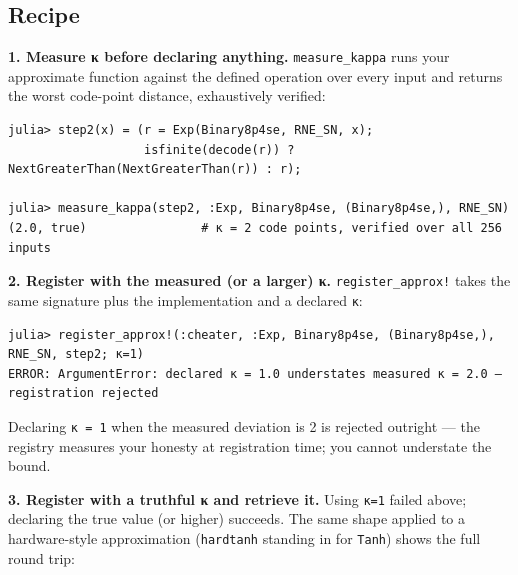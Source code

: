 \subsection{Recipe}



\label{111379208343275940-dup5}{}


\textbf{1. Measure κ before declaring anything.} \texttt{measure\_\allowbreak{}kappa} runs your approximate function against the defined operation over every input and returns the worst code-point distance, exhaustively verified:




\nopagebreak[4]
\begin{verbatim}
julia> step2(x) = (r = Exp(Binary8p4se, RNE_SN, x);
                   isfinite(decode(r)) ? NextGreaterThan(NextGreaterThan(r)) : r);

julia> measure_kappa(step2, :Exp, Binary8p4se, (Binary8p4se,), RNE_SN)
(2.0, true)                # κ = 2 code points, verified over all 256 inputs
\end{verbatim}



\textbf{2. Register with the measured (or a larger) κ.} \texttt{register\_\allowbreak{}approx!} takes the same signature plus the implementation and a declared \texttt{κ}:




\nopagebreak[4]
\begin{verbatim}
julia> register_approx!(:cheater, :Exp, Binary8p4se, (Binary8p4se,), RNE_SN, step2; κ=1)
ERROR: ArgumentError: declared κ = 1.0 understates measured κ = 2.0 — registration rejected
\end{verbatim}



Declaring \texttt{κ = 1} when the measured deviation is 2 is rejected outright — the registry measures your honesty at registration time; you cannot understate the bound.



\textbf{3. Register with a truthful κ and retrieve it.} Using \texttt{κ=1} failed above; declaring the true value (or higher) succeeds. The same shape applied to a hardware-style approximation (\texttt{hardtanh} standing in for \texttt{Tanh}) shows the full round trip:





